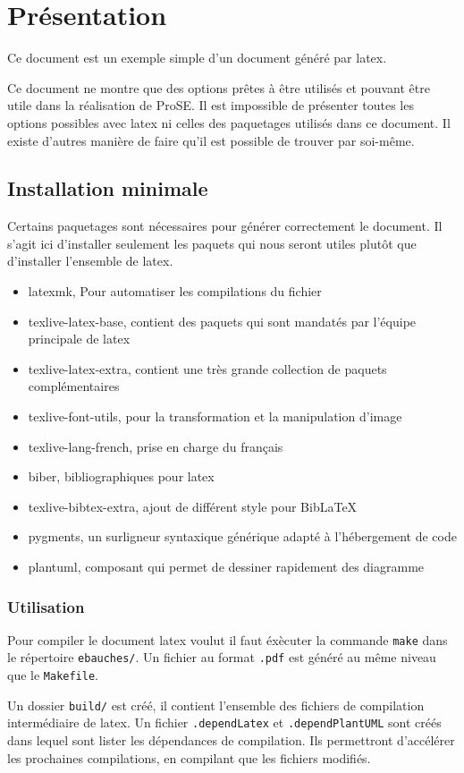 \section{Présentation}
Ce document est un exemple simple d'un document généré par \gls{latex}. \newline

Ce document ne montre que des options prêtes à être utilisés et pouvant être utile dans la réalisation de ProSE.
Il est impossible de présenter toutes les options possibles avec \gls{latex} ni celles des paquetages utilisés
dans ce document.
Il existe d'autres manière de faire qu'il est possible de trouver par soi-même.

\subsection{Installation minimale}
Certains paquetages sont nécessaires pour générer correctement le document.
Il s'agit ici d'installer seulement les paquets qui nous seront utiles plutôt que d'installer l'ensemble de \gls{latex}.
\begin{itemize}
    \item latexmk, Pour automatiser les compilations du fichier
    \item texlive-latex-base, contient des paquets qui sont mandatés par l'équipe principale de \gls{latex}
    \item texlive-latex-extra, contient une très grande collection de paquets complémentaires
    \item texlive-font-utils, pour la transformation et la manipulation d'image
    \item texlive-lang-french, prise en charge du français
    \item biber, bibliographiques pour \gls{latex}
    \item texlive-bibtex-extra, ajout de différent style pour BibLaTeX
    \item pygments, un surligneur syntaxique générique adapté à l'hébergement de code
    \item plantuml, composant qui permet de dessiner rapidement des diagramme
\end{itemize}

\subsubsection{Utilisation}
Pour compiler le document \gls{latex} voulut il faut éxècuter la commande \verb=make= dans le répertoire \verb=ebauches/=.
Un fichier au format \verb=.pdf= est généré au même niveau que le \verb=Makefile=. \newline

Un dossier \verb=build/= est créé, il contient l'ensemble des fichiers de compilation intermédiaire de \gls{latex}.
Un fichier \verb=.dependLatex= et \verb=.dependPlantUML= sont créés dans lequel sont lister les dépendances de compilation.
Ils permettront d'accélérer les prochaines compilations, en compilant que les fichiers modifiés.

